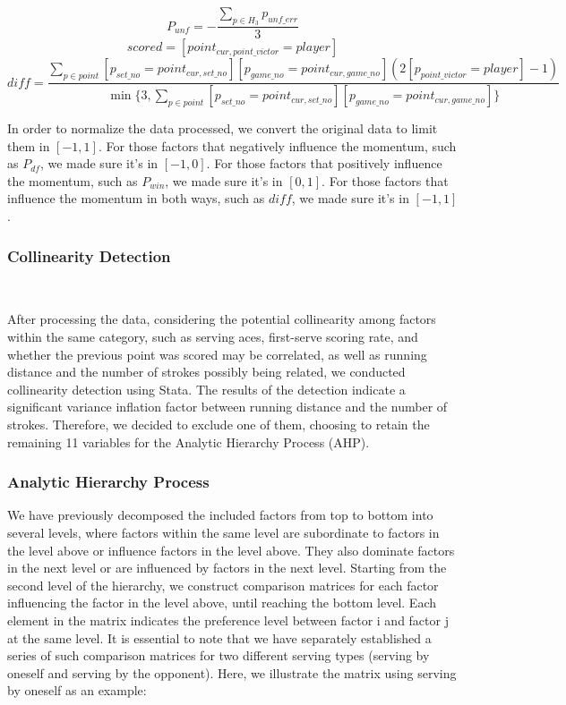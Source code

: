 \begin{equation}
    P_{unf} = -\frac{\sum_{p \in H_3} p_{unf\_err}}{3}
\end{equation}
\begin{equation}
    scored = [point_{cur, point\_victor} = player]
\end{equation}
\begin{equation}
    diff = \frac{\sum_{p \in point}[p_{set\_no} = point_{cur, set\_no}][p_{game\_no} = point_{cur, game\_no}](2[p_{point\_victor} = player]-1)}{\min\{3, \sum_{p \in point}[p_{set\_no} = point_{cur, set\_no}][p_{game\_no} = point_{cur, game\_no}]\}}
\end{equation}
\par In order to normalize the data processed, we convert the original data to limit them in $[-1, 1]$. 
For those factors that negatively influence the momentum, such as $P_{df}$, we made sure it's in $[-1, 0]$. For those factors that positively influence the momentum, such as $P_{win}$, we made sure it's in $[0, 1]$. For those factors that influence the momentum in both ways, such as $diff$, we made sure it's in $[-1, 1]$.

\subsubsection{Collinearity Detection}~{}

After processing the data, considering the potential collinearity among factors within the same category,
such as serving aces, first-serve scoring rate, and whether the previous point was scored may 
be correlated, as well as running distance and the number of strokes possibly being related, 
we conducted collinearity detection using Stata. The results of the detection indicate a
significant variance inflation factor between running distance and the number of strokes. 
Therefore, we decided to exclude one of them, choosing to retain the remaining 11 variables 
for the Analytic Hierarchy Process (AHP).

\subsubsection{Analytic Hierarchy Process}

We have previously decomposed the included factors from top to bottom into several levels, 
where factors within the same level are subordinate to factors in the level above or influence 
factors in the level above. They also dominate factors in the next level or are influenced by 
factors in the next level. Starting from the second level of the hierarchy, we construct 
comparison matrices for each factor influencing the factor in the level above, until reaching 
the bottom level. Each element in the matrix indicates the preference level between factor i and 
factor j at the same level. It is essential to note that we have separately established a series 
of such comparison matrices for two different serving types (serving by oneself and serving by 
the opponent). Here, we illustrate the matrix using serving by oneself as an example:

